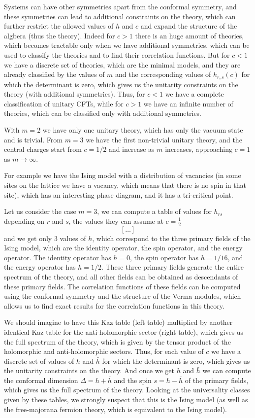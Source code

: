 Systems can have other symmetries apart from the conformal symmetry, and these symmetries can lead to additional constraints on the theory, which can further restrict the allowed values of \(h\) and \(c\) and expand the structure of the algbera (thus the theory). Indeed for \(c>1\) there is an huge amount of theories, which becomes tractable only when we have additional symmetries, which can be used to classify the theories and to find their correlation functions. But for \(c<1\) we have a discrete set of theories, which are the minimal models, and they are already classified by the values of \(m\) and the corresponding values of \(h_{r,s}(c)\) for which the determinant is zero, which gives us the unitarity constraints on the theory (with additional symmetries). Thus, for \(c<1\) we have a complete classification of unitary CFTs, while for \(c>1\) we have an infinite number of theories, which can be classified only with additional symmetries.

With \(m=2\) we have only one unitary theory, which has only the vacuum state and is trivial. From \(m=3\) we have the first non-trivial unitary theory, and the central charges start from \(c=1/2\) and increase as \(m\) increases, approaching \(c=1\) as \(m \to \infty\).

For example we have the Ising model with a distribution of vacancies (in some sites on the lattice we have a vacancy, which means that there is no spin in that site), which has an interesting phase diagram, and it has a tri-critical point.

Let us consider the case \(m=3\), we can compute a table of values for \(h_{rs}\) depending on \(r\) and \(s\), the values they can assume at \(c = \frac{1}{2}\)
\[
    [\dots]
\]
and we get only 3 values of \(h\), which correspond to the three primary fields of the Ising model, which are the identity operator, the spin operator, and the energy operator. The identity operator has \(h=0\), the spin operator has \(h=1/16\), and the energy operator has \(h=1/2\). These three primary fields generate the entire spectrum of the theory, and all other fields can be obtained as descendants of these primary fields. The correlation functions of these fields can be computed using the conformal symmetry and the structure of the Verma modules, which allows us to find exact results for the correlation functions in this theory.

We should imagine to have this Kaz table (left table) multiplied by another identical Kaz table for the anti-holomorphic sector (right table), which gives us the full spectrum of the theory, which is given by the tensor product of the holomorphic and anti-holomorphic sectors. Thus, for each value of \(c\) we have a discrete set of values of \(h\) and \(\bar{h}\) for which the determinant is zero, which gives us the unitarity constraints on the theory. And once we get \(h\) and \(\bar{h}\) we can compute the conformal dimension \(\Delta = h + \bar{h}\) and the spin \(s = h - \bar{h}\) of the primary fields, which gives us the full spectrum of the theory. Looking at the universality classes given by these tables, we strongly suspect that this is the Ising model (as well as the free-majorana fermion theory, which is equivalent to the Ising model).

